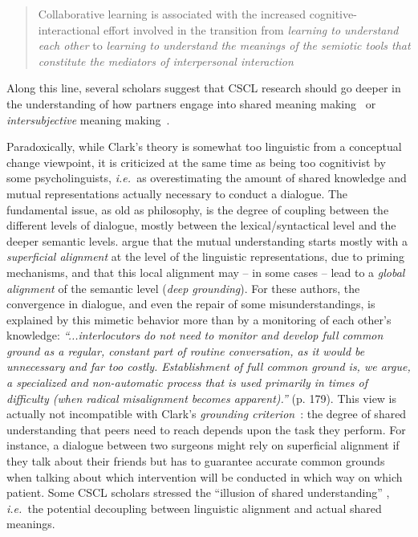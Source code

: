 \documentclass[twocolumn]{article}
\newcommand{\ie}{{\textit{i.e.\ }}}
\begin{document}
\begin{quote}
Collaborative learning is associated with the increased
cognitive-interactional effort involved in the transition from \emph{learning to
understand each other} to \emph{learning to understand the meanings of the semiotic
tools that constitute the mediators of interpersonal
interaction}~\citep{baker1999role}
\end{quote}

Along this line, several scholars suggest that CSCL research should go deeper in
the understanding of how partners engage into shared meaning
making~\cite{stahl2007meaning} or \emph{intersubjective} meaning
making~\cite{suthers2006technology}.

Paradoxically, while Clark's theory is somewhat too linguistic from a conceptual
change viewpoint, it is criticized at the same time as being too cognitivist by
some psycholinguists, \ie as overestimating the amount of shared knowledge and
mutual representations actually necessary to conduct a dialogue. The fundamental
issue, as old as philosophy, is the degree of coupling between the different
levels of dialogue, mostly between the lexical/syntactical level and the deeper
semantic levels. \citet{pickering2006alignment} argue that the mutual
understanding starts mostly with a \emph{superficial alignment} at the level of
the linguistic representations, due to priming mechanisms, and that this local
alignment may -- in some cases -- lead to a \emph{global alignment} of the
semantic level (\emph{deep grounding}).  For these authors, the convergence in
dialogue, and even the repair of some misunderstandings, is explained by this
mimetic behavior more than by a monitoring of each other's knowledge:
\emph{``...interlocutors do not need to monitor and develop full common ground
as a regular, constant part of routine conversation, as it would be
unnecessary and far too costly. Establishment of full common ground is, we
argue, a specialized and non-automatic process that is used primarily in
times of difficulty (when radical misalignment becomes apparent).''} (p. 179).
This view is actually not incompatible with Clark's \emph{grounding
criterion}~\cite{clark1989contributing}: the degree of shared understanding that
peers need to reach depends upon the task they perform. For instance, a dialogue
between two surgeons might rely on superficial alignment if they talk about
their friends but has to guarantee accurate common grounds when talking about
which intervention will be conducted in which way on which patient.  Some CSCL
scholars stressed the ``illusion of shared understanding'' ,
\ie the potential decoupling between linguistic alignment and actual shared
meanings.
\end{document}
